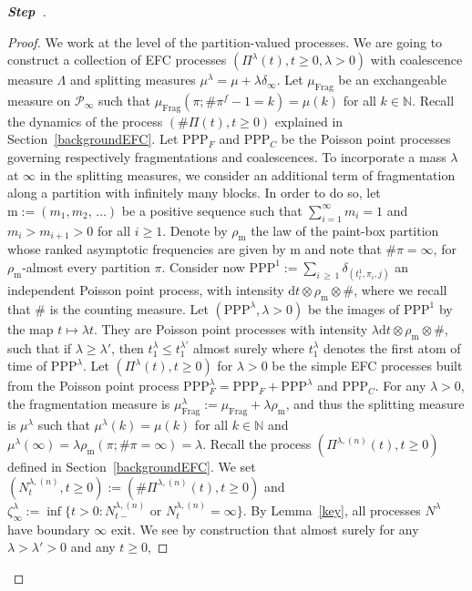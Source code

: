 \documentclass[10pt]{amsart}
\theoremstyle{definition}\newtheorem{defi}[theo]{Definition}\newtheorem{rema}[theo]{Remark}\newtheorem{exam}[theo]{Example}\newtheorem{exem}[theo]{Example}\newtheorem{nota}[theo]{Notation}
\newcommand{\ddr}{\mathrm{d}}
\newcommand{\rmm}{\mathrm{m}}
\newcommand{\PPP}{\mathrm{PPP}}
\newcommand{\Frag}{\mathrm{Frag}}
\newcommand{\bbN}{\mathbb{N}}
\newcommand{\clP}{\mathcal{P}}
\newcounter{stepcount}
\newenvironment{step}{\refstepcounter{stepcount}\begin{proof}[\textbf{Step~\thestepcount}]}{\end{proof}}
\begin{document}
\begin{step}
\begin{proof}
We work at the level of the partition-valued processes. We are going to construct a collection of EFC processes $(\Pi^{\lambda}(t),t\geq 0,\lambda>0)$ with coalescence measure $\Lambda$ and splitting measures $\mu^{\lambda}=\mu+\lambda \delta_{\infty}$. Let $\mu_{\Frag}$ be an exchangeable measure on $\clP_{\infty}$ such that $\mu_{\Frag}(\pi;\#\pi^{f}-1=k)=\mu(k)$ for all $k\in \bbN$. Recall the dynamics of the process $(\#\Pi(t),t\geq 0)$ explained in Section~\ref{backgroundEFC}. Let $\PPP_F$ and $\PPP_C$ be the Poisson point processes governing respectively fragmentations and coalescences. To incorporate a mass $\lambda$ at $\infty$ in the splitting measures, we consider an additional term of fragmentation along a partition with infinitely many blocks. In order to do so, let $\rmm:=(m_1,m_2,\,\ldots)$ be a positive sequence such that $\sum_{i=1}^{\infty}m_i=1$ and $m_i>m_{i+1}>0$ for all $i\geq 1$. Denote by $\rho_{\rmm}$ the law of the paint-box partition whose ranked asymptotic frequencies are given by $\rmm$ and note that $\#\pi=\infty$, for $\rho_{\rmm}$-almost every partition $\pi$. Consider now $\PPP^{1}:=\sum_{i\,\geq\,1}\delta_{(t^{1}_i,\pi_i,j)}$ an independent Poisson point process, with intensity $\ddr t\otimes \rho_{\rmm}\otimes \#$, where we recall that $\#$ is the counting measure. Let $(\PPP^{\lambda}, \lambda>0)$ be the images of $\PPP^{1}$ by the map $t\mapsto \lambda t$. They are Poisson point processes with intensity $\lambda \ddr t\otimes \rho_{\rmm}\otimes \#$, such that if $\lambda\geq \lambda'$, then $t_1^{\lambda}\leq t_1^{\lambda'}$ almost surely where $t_1^{\lambda}$ denotes the first atom of time of $\PPP^{\lambda}$. Let $(\Pi^{\lambda}(t),t\geq 0)$ for $\lambda>0$ be the simple EFC processes built from the Poisson point process $\PPP^{\lambda}_{F}=\PPP_F+\PPP^{\lambda}$ and $\PPP_C$. For any $\lambda>0$, the fragmentation measure is $\mu^{\lambda}_{\Frag}:=\mu_{\Frag}+\lambda \rho_{\rmm}$, and thus the splitting measure is $\mu^{\lambda}$ such that $\mu^{\lambda}(k)=\mu(k)$ for all $k\in \bbN$ and $\mu^{\lambda}(\infty)=\lambda \rho_{\rmm}(\pi; \#\pi=\infty)=\lambda$. Recall the process $(\Pi^{\lambda,(n)}(t),t\geq 0)$ defined in Section~\ref{backgroundEFC}. We set $(N_t^{\lambda,(n)},t\geq 0):=(\#\Pi^{\lambda,(n)}(t),t\geq 0)$ and $\zeta_{\infty}^{\lambda}:=\inf\{t>0: N_{t-}^{\lambda,(n)}\text{ or } N_{t}^{\lambda,(n)}=\infty\}$. By Lemma~\ref{key}, all processes $N^{\lambda}$ have boundary $\infty$ exit. We see by construction that almost surely for any $\lambda>\lambda'>0$ and any $t\geq 0$,

\end{proof}
\end{step}
\end{document}
